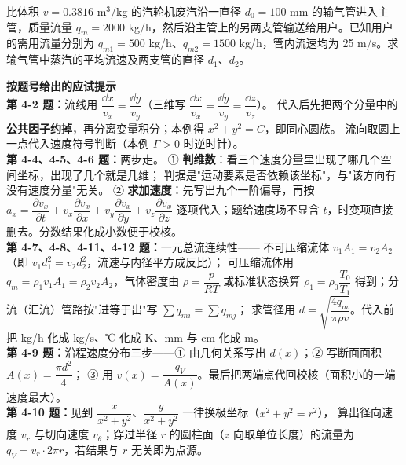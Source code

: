 \begin{ti}
\item[\textbf{4-12}] 比体积 $v=0.3816$ m$^3$/kg 的汽轮机废汽沿一直径 $d_0=100$ mm 的输气管进入主管，质量流量 $q_m=2000$ kg/h，然后沿主管上的另两支管输送给用户。已知用户的需用流量分别为 $q_{m1}=500$ kg/h、$q_{m2}=1500$ kg/h，管内流速均为 25 m/s。求输气管中蒸汽的平均流速及两支管的直径 $d_1$、$d_2$。
\quad{}\quad{}

\end{ti}

\begin{banfa}
\textbf{按题号给出的应试提示}\\
\textbf{第 4-2 题：}流线用 $\dfrac{\dd x}{v_x}=\dfrac{\dd y}{v_y}$（三维写 $\dfrac{\dd x}{v_x}=\dfrac{\dd y}{v_y}=\dfrac{\dd z}{v_z}$）。
代入后先把两个分量中的\textbf{公共因子约掉}，再分离变量积分；本例得 $x^2+y^2=C$，即同心圆族。
流向取圆上一点代入速度符号判断（本例 $\Gamma>0$ 时逆时针）。\\
\textbf{第 4-4、4-5、4-6 题：}两步走。
① \textbf{判维数}：看三个速度分量里出现了哪几个空间坐标，出现了几个就是几维；
判据是"运动要素是否依赖该坐标"，与"该方向有没有速度分量"无关。
② \textbf{求加速度}：先写出九个一阶偏导，再按
$a_x=\dfrac{\partial v_x}{\partial t}+v_x\dfrac{\partial v_x}{\partial x}+v_y\dfrac{\partial v_x}{\partial y}+v_z\dfrac{\partial v_x}{\partial z}$
逐项代入；题给速度场不显含 $t$，时变项直接删去。分数结果化成小数便于校核。\\
\textbf{第 4-7、4-8、4-11、4-12 题：}一元总流连续性——
不可压缩流体 $v_1A_1=v_2A_2$（即 $v_1d_1^2=v_2d_2^2$，流速与内径平方成反比）；
可压缩流体用 $q_m=\rho_1v_1A_1=\rho_2v_2A_2$，气体密度由 $\rho=\dfrac{p}{RT}$ 或标准状态换算
$\rho_1=\rho_0\dfrac{T_0}{T_1}$ 得到；分流（汇流）管路按"进等于出"写 $\sum q_{mi}=\sum q_{mj}$；
求管径用 $d=\sqrt{\dfrac{4q_m}{\pi\rho v}}$。代入前把 kg/h 化成 kg/s、℃ 化成 K、mm 与 cm 化成 m。\\
\textbf{第 4-9 题：}沿程速度分布三步——① 由几何关系写出 $d(x)$；② 写断面面积 $A(x)=\dfrac{\pi d^2}{4}$；
③ 用 $v(x)=\dfrac{q_V}{A(x)}$。最后把两端点代回校核（面积小的一端速度最大）。\\
\textbf{第 4-10 题：}见到 $\dfrac{x}{x^2+y^2}$、$\dfrac{y}{x^2+y^2}$ 一律换极坐标（$x^2+y^2=r^2$），
算出径向速度 $v_r$ 与切向速度 $v_\theta$；穿过半径 $r$ 的圆柱面（$z$ 向取单位长度）的流量为
$q_V=v_r\cdot2\pi r$，若结果与 $r$ 无关即为点源。
\end{banfa}

